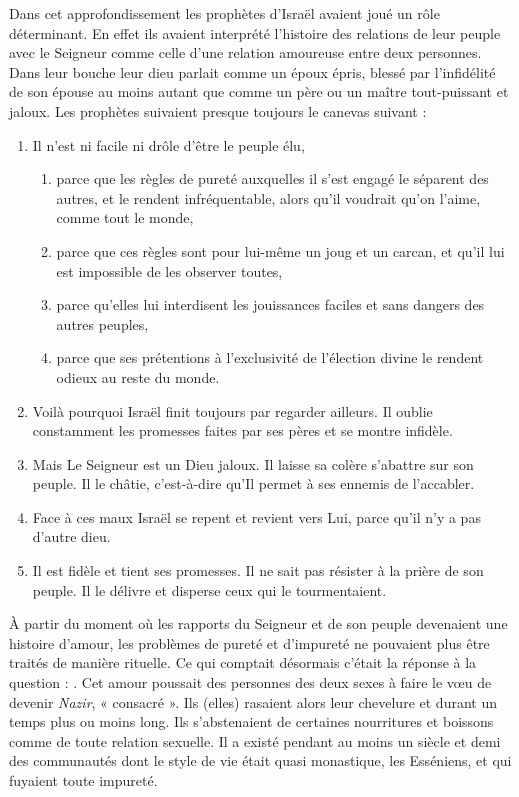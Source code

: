  Dans cet approfondissement les prophètes d'Israël avaient joué un rôle déterminant. En effet ils avaient interprété l'histoire des relations de leur peuple avec le Seigneur comme celle d'une relation amoureuse entre deux personnes. Dans leur bouche leur dieu parlait comme un époux épris, blessé par l'infidélité de son épouse au moins autant que comme un père ou un maître tout-puissant et jaloux. 
Les prophètes suivaient presque toujours le canevas suivant :
\begin{enumerate}
\item Il n'est ni facile ni drôle d'être le peuple élu,
 \begin{enumerate}
 \item parce que les règles de pureté auxquelles il s'est engagé le séparent des autres, et le rendent infréquentable, alors qu'il voudrait qu'on l'aime, comme tout le monde,
 \item parce que ces règles sont pour lui-même un joug et un carcan, et qu'il lui est impossible de les observer toutes,
 \item parce qu'elles lui interdisent les jouissances faciles et sans dangers des autres peuples,
 \item parce que ses prétentions à l'exclusivité de l'élection divine le rendent odieux au reste du monde. 
 \end{enumerate}
\item Voilà pourquoi Israël finit toujours par regarder ailleurs. Il oublie constamment les promesses faites par ses pères et se montre infidèle. 
\item Mais Le Seigneur est un Dieu jaloux. Il laisse sa colère s'abattre sur son peuple. Il le châtie, c'est-à-dire qu'Il permet à ses ennemis de l'accabler. 
\item Face à ces maux Israël se repent et revient vers Lui, parce qu'il n'y a pas d'autre dieu.
\item Il est fidèle et tient ses promesses. Il ne sait pas résister à la prière de son peuple. Il le délivre et disperse ceux qui le tourmentaient.
\end{enumerate}

 À partir du moment où les rapports du Seigneur et de son peuple devenaient une histoire d'amour, les problèmes de pureté et d'impureté ne pouvaient plus être traités de manière rituelle. Ce qui comptait désormais c'était la réponse à la question : . Cet amour poussait des personnes des deux sexes à faire le vœu de devenir \emph{Nazir}, « consacré ». Ils (elles) rasaient alors leur chevelure et durant un temps plus ou moins long. Ils s'abstenaient de certaines nourritures et boissons comme de toute relation sexuelle. Il a existé pendant au moins un siècle et demi des communautés dont le style de vie était quasi monastique, les Esséniens, et qui fuyaient toute impureté. 

